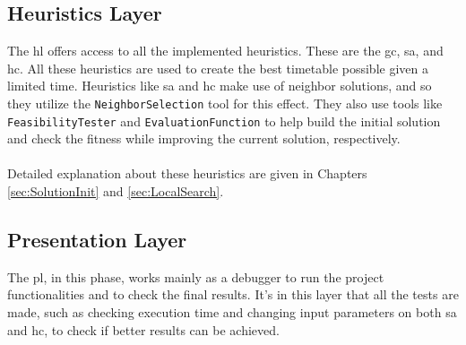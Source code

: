 \subsection{Heuristics Layer}

The \gls{hl} offers access to all the implemented heuristics. These are the \gls{gc}, \gls{sa}, and \gls{hc}. All these heuristics are used to create the best timetable possible given a limited time. Heuristics like \gls{sa} and \gls{hc} make use of neighbor solutions, and so they utilize the \verb+NeighborSelection+ tool for this effect. They also use tools like \verb+FeasibilityTester+ and \verb+EvaluationFunction+ to help build the initial solution and check the fitness while improving the current solution, respectively.\\
\\
Detailed explanation about these heuristics are given in Chapters \ref{sec:SolutionInit} and \ref{sec:LocalSearch}.

\subsection{Presentation Layer}

The \gls{pl}, in this phase, works mainly as a debugger to run the project functionalities and to check the final results. It's in this layer that all the tests are made, such as checking execution time and changing input parameters on both \gls{sa} and \gls{hc}, to check if better results can be achieved.










